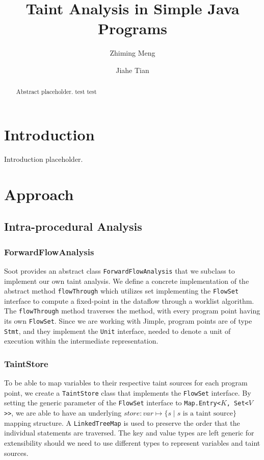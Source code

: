 \documentclass[acmsmall]{acmart}
\begin{document}
\title{Taint Analysis in Simple Java Programs}

\author{Zhiming Meng}

\author{Jiahe Tian}

\begin{abstract}
    Abstract placeholder. test test
\end{abstract}

\maketitle

\section{Introduction}
Introduction placeholder.

\section{Approach}
\subsection{Intra-procedural Analysis}
\subsubsection{ForwardFlowAnalysis} Soot provides an abstract class \texttt{ForwardFlowAnalysis} that we subclass to implement our own taint analysis. We define a concrete implementation of the abstract method \texttt{flowThrough} which utilizes set implementing the \texttt{FlowSet} interface to compute a fixed-point in the dataflow through a worklist algorithm. The \texttt{flowThrough} method traverses the method, with every program point having its own \texttt{FlowSet}. Since we are working with Jimple, program points are of type \texttt{Stmt}, and they implement the \texttt{Unit} interface, needed to denote a unit of execution within the intermediate representation.

\subsubsection{TaintStore} To be able to map variables to their respective taint sources for each program point, we create a \texttt{TaintStore} class that implements the \texttt{FlowSet} interface. By setting the generic parameter of the \texttt{FlowSet} interface to \texttt{Map.Entry<$K$, Set<$V$>{}>}, we are able to have an underlying $store:var \mapsto \{s \mid s \text{ is a taint source}\}$ mapping structure. A \texttt{LinkedTreeMap} is used to preserve the order that the individual statements are traversed. The key and value types are left generic for extensibility should we need to use different types to represent variables and taint sources. 
\end{document}
